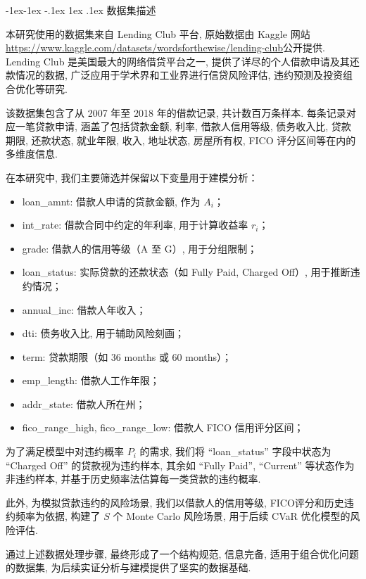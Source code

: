 \documentclass{write_paper}
\makeatletter
\renewcommand\subsection{\@startsection{subsection}{2}{\z@}%
                                     {-1ex\@plus -1ex \@minus -.1ex}%
                                     {1ex \@plus .1ex}%
                                     {\normalfont \normalsize \bfseries}}
\makeatother
\begin{document}
\subsection{数据集描述}

\label{subsec:dataset_description}

本研究使用的数据集来自 Lending Club 平台, 原始数据由 Kaggle 网站\url{https://www.kaggle.com/datasets/wordsforthewise/lending-club}公开提供. Lending Club 是美国最大的网络借贷平台之一, 提供了详尽的个人借款申请及其还款情况的数据, 广泛应用于学术界和工业界进行信贷风险评估, 违约预测及投资组合优化等研究. 

该数据集包含了从 2007 年至 2018 年的借款记录, 共计数百万条样本. 每条记录对应一笔贷款申请, 涵盖了包括贷款金额, 利率, 借款人信用等级, 债务收入比, 贷款期限, 还款状态, 就业年限, 收入, 地址状态, 房屋所有权, FICO 评分区间等在内的多维度信息. 

在本研究中, 我们主要筛选并保留以下变量用于建模分析：

\begin{itemize}
  \item{loan\_amnt}: 借款人申请的贷款金额, 作为 $A_i$；
  \item{int\_rate}: 借款合同中约定的年利率, 用于计算收益率 $r_i$；
  \item{grade}: 借款人的信用等级（A 至 G）, 用于分组限制；
  \item{loan\_status}: 实际贷款的还款状态（如 Fully Paid, Charged Off）, 用于推断违约情况；
  \item{annual\_inc}: 借款人年收入；
  \item{dti}: 债务收入比, 用于辅助风险刻画；
  \item{term}: 贷款期限（如 36 months 或 60 months）；
  \item{emp\_length}: 借款人工作年限；
  \item{addr\_state}: 借款人所在州；
  \item{fico\_range\_high, fico\_range\_low}: 借款人 FICO 信用评分区间；
\end{itemize}

为了满足模型中对违约概率 $P_i$ 的需求, 我们将 ``loan\_status'' 字段中状态为 ``Charged Off'' 的贷款视为违约样本, 其余如 ``Fully Paid'', ``Current'' 等状态作为非违约样本, 并基于历史频率法估算每一类贷款的违约概率. 

此外, 为模拟贷款违约的风险场景, 我们以借款人的信用等级, FICO评分和历史违约频率为依据, 构建了 $S$ 个 Monte Carlo 风险场景, 用于后续 CVaR 优化模型的风险评估. 

通过上述数据处理步骤, 最终形成了一个结构规范, 信息完备, 适用于组合优化问题的数据集, 为后续实证分析与建模提供了坚实的数据基础. 
\end{document}
